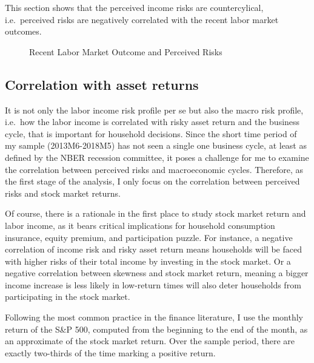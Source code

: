\documentclass[12pt,notitlepage,onecolumn,aps,pra]{article}
\begin{document}
This section shows that the perceived income risks are countercylical,
i.e.~perceived risks are negatively correlated with the recent labor
market outcomes.


    \begin{figure}[!ht]
        \begin{center}\end{center}
        \caption{Recent Labor Market Outcome and Perceived Risks}
        \label{fig:tshe}
    \end{figure}
    
    \hypertarget{correlation-with-asset-returns}{%
\subsection{Correlation with asset
returns}\label{correlation-with-asset-returns}}

It is not only the labor income risk profile per se but also the macro
risk profile, i.e.~how the labor income is correlated with risky asset
return and the business cycle, that is important for household
decisions. Since the short time period of my sample (2013M6-2018M5) has
not seen a single one business cycle, at least as defined by the NBER
recession committee, it poses a challenge for me to examine the
correlation between perceived risks and macroeconomic cycles. Therefore,
as the first stage of the analysis, I only focus on the correlation
between perceived risks and stock market returns.

Of course, there is a rationale in the first place to study stock market
return and labor income, as it bears critical implications for household
consumption insurance, equity premium, and participation puzzle. For
instance, a negative correlation of income risk and risky asset return
means households will be faced with higher risks of their total income
by investing in the stock market. Or a negative correlation between
skewness and stock market return, meaning a bigger income increase is
less likely in low-return times will also deter households from
participating in the stock market.

Following the most common practice in the finance literature, I use the
monthly return of the S\&P 500, computed from the beginning to the end
of the month, as an approximate of the stock market return. Over the
sample period, there are exactly two-thirds of the time marking a
positive return.
\end{document}
